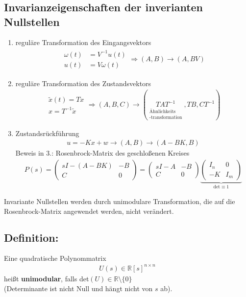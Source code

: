 \documentclass[ngerman]{tudscrreprt}
\begin{document}
\subsection*{Invarianzeigenschaften der inverianten Nullstellen}
\begin{enumerate}
\item reguläre Transformation des Eingangsvektors \begin{align*}
\begin{matrix}
\omega(t) &= V^{-1}u(t)\\ 
u(t)&= V\omega(t) \end{matrix} \Rightarrow (A,B) \to (A,BV)
\end{align*}
\item reguläre Transformation des Zustandsvektors 
\begin{align*}
\begin{matrix}
\tilde x(t) = Tx\\ 
x = T^{-1} \tilde x \end{matrix}
 \Rightarrow (A,B,C) \to (\underset{\substack{\text{Ähnlichkeits}\\ \text{-transformation}}}{TAT^{-1}},TB, CT^{-1})
\end{align*}
\item Zustandsrückführung \begin{align*}
u = -Kx + w \rightarrow (A,B) \to (A - BK, B) 
\end{align*} Beweis in 3.: Rosenbrock-Matrix des geschloßenen Kreises
\begin{align*}
P(s) = \begin{pmatrix} sI - (A-BK) & -B\\ C & 0\end{pmatrix} = \begin{pmatrix} sI-A & -B\\ C & 0 \end{pmatrix} \underbrace{\begin{pmatrix} I_n & 0 \\ -K & I_m \end{pmatrix} }_{\text{det}\equiv 1} 
\end{align*}
\end{enumerate}
Invariante Nullstellen werden durch unimodulare Transformation, die auf die Rosenbrock-Matrix angewendet werden, nicht verändert. 
\subsection*{Definition:} Eine quadratische Polynommatrix \begin{align*}
U(s) \in \mathbb{R}[s]^{n\times n}
\end{align*}heißt \textbf{unimodular}, falls det$(U) \in \mathbb{R} \setminus \{0\}$\\ 
(Determinante ist nicht Null und hängt nicht von $s$ ab).
\end{document}
